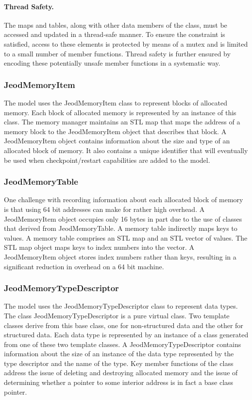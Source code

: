 \paragraph{Thread Safety.}
The maps and tables, along with other data members of the class, must be
accessed and updated in a thread-safe manner.
To ensure the constraint is satisfied, access to these elements is
protected by means of a mutex and is limited to a small number of
member functions.
Thread safety is further ensured by encoding these potentially unsafe
member functions in a systematic way.

\subsubsection{JeodMemoryItem}
The model uses the JeodMemoryItem class to represent blocks of allocated memory.
Each block of allocated memory is represented by an instance of this class.
The memory manager maintains an STL map that maps the address of a memory block
to the JeodMemoryItem object that describes that block.
A JeodMemoryItem object contains information about the size and type of
an allocated block of memory. It also contains a unique identifier that will
eventually be used when checkpoint/restart capabilities are added to the model.

\subsubsection{JeodMemoryTable}
One challenge with recording information about each allocated block of memory
is that using 64 bit addresses can make for rather high overhead.
A JeodMemoryItem object occupies only 16 bytes in part due to the use of
classes that derived from JeodMemoryTable. A memory table indirectly maps keys
to values. A memory table comprises an STL map and an STL vector of values.
The STL map object maps keys to index numbers into the vector. A JeodMemoryItem
object stores index numbers rather than keys, resulting in a significant
reduction in overhead on a 64 bit machine.
 
\subsubsection{JeodMemoryTypeDescriptor}
The model uses the JeodMemoryTypeDescriptor class to represent data types.
The class JeodMemoryTypeDescriptor is a pure virtual class.
Two template classes derive from this base class,
one for non-structured data and the other for structured data.
Each data type is represented by an instance of a class generated from one
of these two template classes.
A JeodMemoryTypeDescriptor contains information about
the size of an instance of the data type represented by the type descriptor
and the name of the type. Key member functions of the class address the issue of
deleting and destroying allocated memory and the issue of determining whether
a pointer to some interior address is in fact a base class pointer.

